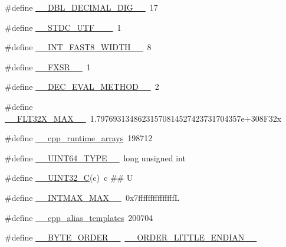 \begin{DoxyCompactItemize}
\item 
\#define \hyperlink{cmake-build-debug_2babel__client__autogen_2moc__predefs_8h_a6b5dca178c4ffe879cd624f9b17b9bd1}{\+\_\+\+\_\+\+D\+B\+L\+\_\+\+D\+E\+C\+I\+M\+A\+L\+\_\+\+D\+I\+G\+\_\+\+\_\+}~17
\item 
\#define \hyperlink{cmake-build-debug_2babel__client__autogen_2moc__predefs_8h_a78e2494c8fce0c7ec9f62865340d6abf}{\+\_\+\+\_\+\+S\+T\+D\+C\+\_\+\+U\+T\+F\+\_\+\_\+\+\_\+}~1
\item 
\#define \hyperlink{cmake-build-debug_2babel__client__autogen_2moc__predefs_8h_afb1605528772a5b37f1235cb1b7cf5ca}{\+\_\+\+\_\+\+I\+N\+T\+\_\+\+F\+A\+S\+T8\+\_\+\+W\+I\+D\+T\+H\+\_\+\+\_\+}~8
\item 
\#define \hyperlink{cmake-build-debug_2babel__client__autogen_2moc__predefs_8h_a8d670e1ec8588185f0fb26433dc12ea1}{\+\_\+\+\_\+\+F\+X\+S\+R\+\_\+\+\_\+}~1
\item 
\#define \hyperlink{cmake-build-debug_2babel__client__autogen_2moc__predefs_8h_a53186c3d05006947fb8bd09bcdb0d60c}{\+\_\+\+\_\+\+D\+E\+C\+\_\+\+E\+V\+A\+L\+\_\+\+M\+E\+T\+H\+O\+D\+\_\+\+\_\+}~2
\item 
\#define \hyperlink{cmake-build-debug_2babel__client__autogen_2moc__predefs_8h_aa2fbfcb03f8deb89dc6122923d47bc76}{\+\_\+\+\_\+\+F\+L\+T32\+X\+\_\+\+M\+A\+X\+\_\+\+\_\+}~1.\+79769313486231570814527423731704357e+308\+F32x
\item 
\#define \hyperlink{cmake-build-debug_2babel__client__autogen_2moc__predefs_8h_ac2dfcd39d29c1e34de6421b15b2cfde9}{\+\_\+\+\_\+cpp\+\_\+runtime\+\_\+arrays}~198712
\item 
\#define \hyperlink{cmake-build-debug_2babel__client__autogen_2moc__predefs_8h_aef86f5642c3dce887635c9fc632baf34}{\+\_\+\+\_\+\+U\+I\+N\+T64\+\_\+\+T\+Y\+P\+E\+\_\+\+\_\+}~long unsigned int
\item 
\#define \hyperlink{cmake-build-debug_2babel__client__autogen_2moc__predefs_8h_a8cc5a4a43af8f7568a450cad0e7d5bd8}{\+\_\+\+\_\+\+U\+I\+N\+T32\+\_\+C}(c)~c \#\# U
\item 
\#define \hyperlink{cmake-build-debug_2babel__client__autogen_2moc__predefs_8h_a6977858c9aa6bb2c67f524a948fc8062}{\+\_\+\+\_\+\+I\+N\+T\+M\+A\+X\+\_\+\+M\+A\+X\+\_\+\+\_\+}~0x7fffffffffffffffL
\item 
\#define \hyperlink{cmake-build-debug_2babel__client__autogen_2moc__predefs_8h_a771caa69aba7d7732ba184f9be109838}{\+\_\+\+\_\+cpp\+\_\+alias\+\_\+templates}~200704
\item 
\#define \hyperlink{cmake-build-debug_2babel__client__autogen_2moc__predefs_8h_a02481ce2087724d8a2fb2322dbc549da}{\+\_\+\+\_\+\+B\+Y\+T\+E\+\_\+\+O\+R\+D\+E\+R\+\_\+\+\_\+}~\hyperlink{cmake-build-debug_2babel__client__autogen_2moc__predefs_8h_a2b695357ce4b46971d54e8e9dfe5724f}{\+\_\+\+\_\+\+O\+R\+D\+E\+R\+\_\+\+L\+I\+T\+T\+L\+E\+\_\+\+E\+N\+D\+I\+A\+N\+\_\+\+\_\+}

\end{DoxyCompactItemize}
